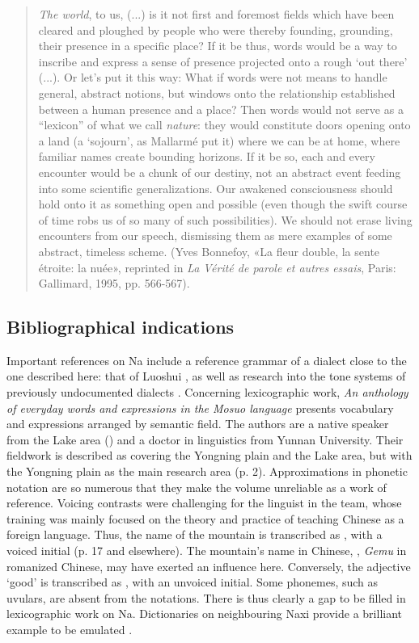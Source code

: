 	\begin{quote}
    \emph{The world}, to us, (...) is it not first and foremost fields which have been cleared and ploughed by people who were thereby founding, grounding, their presence in a specific place? If it be thus, words would be a way to inscribe and express a sense of presence projected onto a rough `out there' (...). Or let's put it this way: What if words were not means to handle general, abstract notions, but windows onto the relationship established between a human presence and a place? Then words would not serve as a ``lexicon'' of what we call \emph{nature}: they would constitute doors opening onto a land (a `sojourn', as Mallarmé put it) where we can be at home, where familiar names create bounding horizons. If it be so, each and every encounter would be a chunk of our destiny, not an abstract event feeding into some scientific generalizations. Our awakened consciousness should hold onto it as something open and possible (even though the swift course of time robs us of so many of such possibilities). We should not erase living encounters from our speech, dismissing them as mere examples of some abstract, timeless scheme. (Yves Bonnefoy, «La fleur double, la sente étroite: la nuée», reprinted in \emph{La Vérité de parole et autres essais}, Paris: Gallimard, 1995, pp. 566-567).
\end{quote}

\subsection{Bibliographical indications}

Important references on Na include a reference grammar of a dialect close to the one described here: that of Luoshui  \parencite{lidz2010}, as well as research into the tone systems of previously undocumented dialects \parencite{a2016,dobbsetal2016,fily_documentation_2022}. Concerning lexicographic work, \emph{An anthology of everyday words and expressions in the Mosuo language} \parencite{zhibaetal2013} presents vocabulary and expressions arranged by semantic field. The authors are a native speaker from the Lake area () and a doctor in linguistics from Yunnan University. Their fieldwork is described as covering the Yongning plain and the Lake area, but with the Yongning plain as the main research area (p. 2). Approximations in phonetic notation are so numerous that they make the volume unreliable as a work of reference. Voicing contrasts were challenging for the linguist in the team, whose training was mainly focused on the theory and practice of teaching Chinese as a foreign language. Thus, the name of the mountain  is transcribed as , with a voiced initial (p. 17 and elsewhere). The mountain’s name in Chinese, , \emph{Gemu} in romanized Chinese, may have exerted an influence here. Conversely, the adjective  ‘good’ is transcribed as , with an unvoiced initial. Some phonemes, such as uvulars, are absent from the notations. There is thus clearly a gap to be filled in lexicographic work on Na. Dictionaries on neighbouring Naxi provide a brilliant example to be emulated \parencite{heetal2011,pinsonetal2012}.

